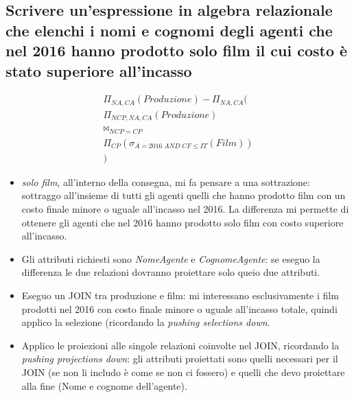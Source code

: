 \subsection*{Scrivere un’espressione in algebra relazionale che elenchi i nomi e cognomi degli agenti che nel 2016 hanno prodotto solo film il cui costo è stato superiore all’incasso}
\begin{align*}\Pi_{NA, CA}(Produzione)-\Pi_{NA, CA}(\\\Pi_{NCP, NA, CA}(Produzione)\\ \Join_{NCP = CP} \\\Pi_{CP}(\sigma_{A=2016\;AND\;CF \leq IT}(Film))\\)\end{align*}
\begin{itemize}
	\item \emph{solo film}, all'interno della consegna, mi fa pensare a una sottrazione: sottraggo all'insieme di tutti gli agenti quelli che hanno prodotto film con un costo finale minore o uguale all'incasso nel 2016. La differenza mi permette di ottenere gli agenti che nel 2016 hanno prodotto solo film con costo superiore all'incasso.
	\item Gli attributi richiesti sono \emph{NomeAgente} e \emph{CognomeAgente}: se eseguo la differenza le due relazioni dovranno proiettare solo queio due attributi.
	\item Eseguo un JOIN tra produzione e film: mi interessano esclusivamente i film prodotti nel 2016 con costo finale minore o uguale all'incasso totale, quindi applico la selezione (ricordando la \emph{pushing selections down}.
	\item Applico le proiezioni alle singole relazioni coinvolte nel JOIN, ricordando la \emph{pushing projections down}: gli attributi proiettati sono quelli necessari per il JOIN (se non li includo è come se non ci fossero) e quelli che devo proiettare alla fine (Nome e cognome dell'agente). 
\end{itemize}

